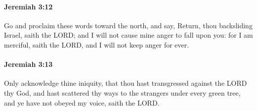 		\paragraph{Jeremiah 3:12} %
			\label{JEREMIAH-3-12}

			Go and proclaim these words toward the north, and say, Return, thou backsliding Israel, saith the LORD; and I will not cause mine anger to fall upon you: for I am merciful, saith the LORD, and I will not keep anger for ever.


		\paragraph{Jeremiah 3:13} %
			\label{JEREMIAH-3-13}

			Only acknowledge thine iniquity, that thou hast transgressed against the LORD thy God, and hast scattered thy ways to the strangers under every green tree, and ye have not obeyed my voice, saith the LORD.

